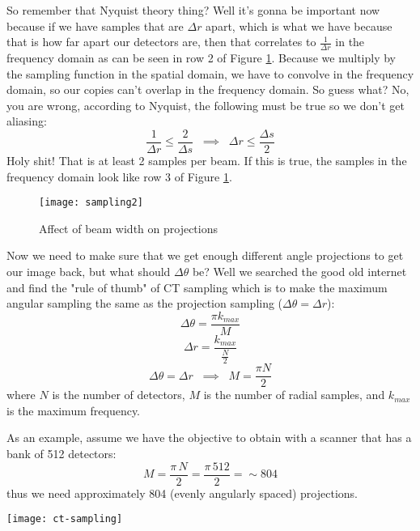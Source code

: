 So remember that Nyquist theory thing? Well it's gonna be important now because if we have samples that are $\Delta r$ apart, which is what we have because that is how far apart our detectors are, then that correlates to $\frac{1}{\Delta r}$ in the frequency domain as can be seen in row 2 of Figure \ref{fig:ct:samp2}. Because we multiply by the sampling function in the spatial domain, we have to convolve in the frequency domain, so our copies can't overlap in the frequency domain. So guess what? No, you are wrong, according to Nyquist, the following must be true so we don't get aliasing:
\begin{equation}
\frac{1}{\Delta r} \leq \frac{2}{\Delta s} \; \; \implies \; \; \Delta r \leq \frac{\Delta s}{2}
\end{equation}
Holy shit! That is at least 2 samples per beam. If this is true, the samples in the frequency domain look like row 3 of Figure \ref{fig:ct:samp2}.
\begin{figure}[ht]
	\centering
	\texttt{[image: sampling2]}
	\caption{Affect of beam width on projections}
	\label{fig:ct:samp2}
\end{figure}
Now we need to make sure that we get enough different angle projections to get our image back, but what should $\Delta \theta$ be? Well we searched the good old internet and find the "rule of thumb" of CT sampling which is to make the maximum angular sampling the same as the projection sampling ($\Delta \theta = \Delta r$):
\begin{equation}
\Delta \theta = \frac{\pi k_{max}}{M}
\end{equation}
\begin{equation}
\Delta r = \frac{k_{max}}{\frac{N}{2}} 
\end{equation}
\begin{equation}
\Delta \theta = \Delta r \; \; \implies \; \; M = \frac{\pi N}{2}
\end{equation}
where $N$ is the number of detectors, $M$ is the number of radial samples, and $k_{max}$ is the maximum frequency. 

As an example, assume we have the objective to obtain with a scanner that has a bank of 512 detectors:
\begin{equation}
M = \frac{\pi\, N}{2} = \frac{\pi\, 512}{2} = \sim 804
\end{equation}
thus we need approximately 804 (evenly angularly spaced) projections.

{\centering
	\texttt{[image: ct-sampling]}
	}